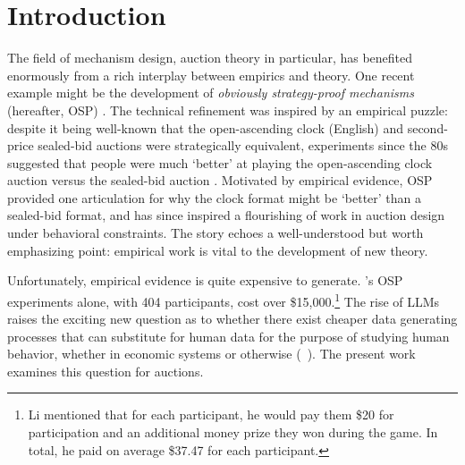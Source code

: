 \documentclass{article} %
\begin{document}
\tableofcontents

\newpage
\onehalfspacing
\section{Introduction} \label{sec:introduction}
The field of mechanism design, auction theory in particular, has benefited enormously from a rich interplay between empirics and theory. 
One recent example might be the development of {\em obviously strategy-proof mechanisms} (hereafter, OSP) \citep{li2017obviously}. 
The technical refinement was inspired by an empirical puzzle: despite it being well-known that the open-ascending clock (English) and second-price sealed-bid auctions were strategically equivalent, experiments since the 80s suggested that people were much `better' at playing the open-ascending clock auction versus the sealed-bid auction \cite{kagel1987information}. 
Motivated by empirical evidence, OSP provided one articulation for why the clock format might be `better' than a sealed-bid format, and has since inspired a flourishing of work in auction design under behavioral constraints. 
The story echoes a well-understood but worth emphasizing point: empirical work is vital to the development of new theory. 

Unfortunately, empirical evidence is quite expensive to generate. 
\cite{li2017obviously}’s OSP experiments alone, with 404 participants, cost over \$15,000.\footnote{Li mentioned that for each participant, he would pay them \$20 for participation and an additional money prize they won during the game. 
In total, he paid on average \$37.47 for each participant.} 
The rise of LLMs raises the exciting new question as to whether there exist cheaper data generating processes that can substitute for human data for the purpose of studying human behavior, whether in economic systems or otherwise (~\cite{bubeck2023sparks, horton2023large, manning2024automated}). 
The present work examines this question for auctions. 
\end{document}
